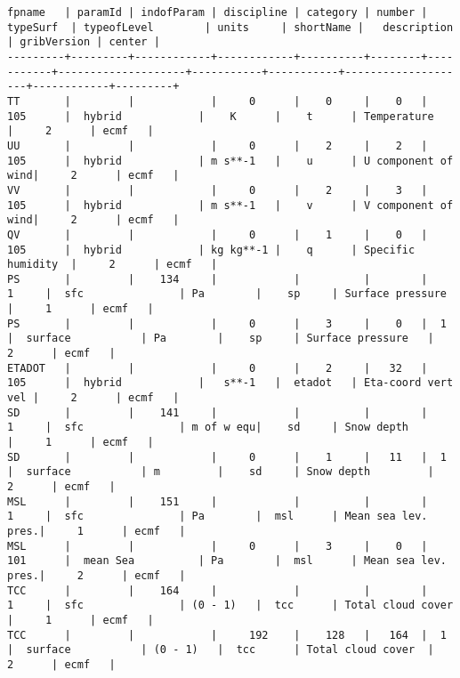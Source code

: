 \documentclass{egu}                  %
\begin{document}
\begin{landscape} 
\begin{scriptsize}\begin{verbatim}
fpname   | paramId | indofParam | discipline | category | number | typeSurf  | typeofLevel        | units     | shortName |   description      | gribVersion | center |
---------+---------+------------+------------+----------+--------+-----------+--------------------+-----------+-----------+--------------------+------------+---------+
TT       |         |            |     0      |    0     |    0   |  105      |  hybrid            |    K      |    t      | Temperature        |     2      | ecmf   |
UU       |         |            |     0      |    2     |    2   |  105      |  hybrid            | m s**-1   |    u      | U component of wind|     2      | ecmf   |
VV       |         |            |     0      |    2     |    3   |  105      |  hybrid            | m s**-1   |    v      | V component of wind|     2      | ecmf   |
QV       |         |            |     0      |    1     |    0   |  105      |  hybrid            | kg kg**-1 |    q      | Specific humidity  |     2      | ecmf   |
PS       |         |    134     |            |          |        |     1     |  sfc               | Pa        |    sp     | Surface pressure   |     1      | ecmf   |
PS       |         |            |     0      |    3     |    0   |  1        |  surface           | Pa        |    sp     | Surface pressure   |     2      | ecmf   |
ETADOT   |         |            |     0      |    2     |   32   |  105      |  hybrid            |   s**-1   |  etadot   | Eta-coord vert vel |     2      | ecmf   |
SD       |         |    141     |            |          |        |     1     |  sfc               | m of w equ|    sd     | Snow depth         |     1      | ecmf   |
SD       |         |            |     0      |    1     |   11   |  1        |  surface           | m         |    sd     | Snow depth         |     2      | ecmf   |
MSL      |         |    151     |            |          |        |     1     |  sfc               | Pa        |  msl      | Mean sea lev. pres.|     1      | ecmf   |
MSL      |         |            |     0      |    3     |    0   |  101      |  mean Sea          | Pa        |  msl      | Mean sea lev. pres.|     2      | ecmf   |
TCC      |         |    164     |            |          |        |     1     |  sfc               | (0 - 1)   |  tcc      | Total cloud cover  |     1      | ecmf   |
TCC      |         |            |     192    |    128   |   164  |  1        |  surface           | (0 - 1)   |  tcc      | Total cloud cover  |     2      | ecmf   |

\end{verbatim}
\end{scriptsize}
\end{landscape}
\end{document}
